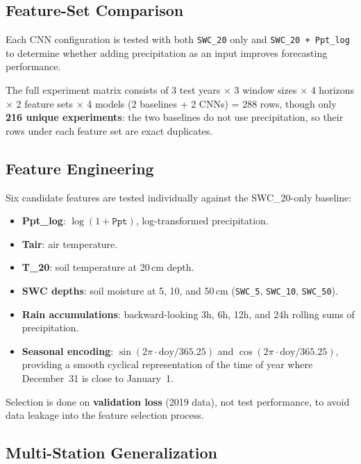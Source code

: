 \documentclass[11pt]{article}
\begin{document}
\subsection{Feature-Set Comparison}

Each CNN configuration is tested with both \texttt{SWC\_20} only and
\texttt{SWC\_20 + Ppt\_log} to determine whether adding precipitation as an input
improves forecasting performance.

The full experiment matrix consists of 3 test years $\times$ 3 window sizes $\times$
4 horizons $\times$ 2 feature sets $\times$ 4 models (2 baselines + 2 CNNs) = 288
rows, though only \textbf{216 unique experiments}: the two baselines do not use
precipitation, so their rows under each feature set are exact duplicates.

\subsection{Feature Engineering}

Six candidate features are tested individually against the SWC\_20-only baseline:
\begin{itemize}
    \item \textbf{Ppt\_log}: $\log(1 + \texttt{Ppt})$, log-transformed precipitation.
    \item \textbf{Tair}: air temperature.
    \item \textbf{T\_20}: soil temperature at 20\,cm depth.
    \item \textbf{SWC depths}: soil moisture at 5, 10, and 50\,cm
    (\texttt{SWC\_5}, \texttt{SWC\_10}, \texttt{SWC\_50}).
    \item \textbf{Rain accumulations}: backward-looking 3h, 6h, 12h, and 24h rolling
    sums of precipitation.
    \item \textbf{Seasonal encoding}: $\sin(2\pi \cdot \text{doy}/365.25)$ and
    $\cos(2\pi \cdot \text{doy}/365.25)$, providing a smooth cyclical representation
    of the time of year where December~31 is close to January~1.
\end{itemize}
Selection is done on \textbf{validation loss} (2019 data), not test performance, to
avoid data leakage into the feature selection process.

\subsection{Multi-Station Generalization}
\end{document}
